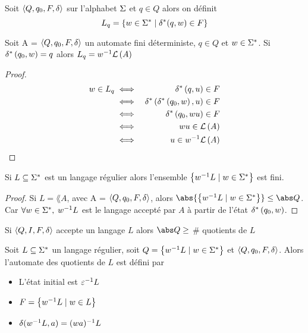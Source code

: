\begin{definition}
	Soit $\langle Q, q_0, F, \delta \rangle$ sur l'alphabet $\Sigma$ et $q \in Q$ alors on définit
	$$ L_q = \left\{w \in \Sigma^{*} \mid \delta^{*} (q,w) \in F\right\} $$
\end{definition}


\begin{lemma}
	Soit A = $\langle Q, q_0, F, \delta \rangle$ un automate fini déterministe, $q \in Q$ et $w \in \Sigma^{*}$. Si $\delta^{*} \left(q_0,w\right) = q$ alors
	$L_q = w^{-1} \mathcal{L}\left(A\right)$
\end{lemma}

\begin{proof}
	\begin{eqnarray*}
		w \in L_q &\iff& \delta^{*} \left(q,u\right) \in F \\
		&\iff& \delta^{*} \left(\delta^{*} \left(q_0,w\right),u\right) \in F \\
		&\iff& \delta^{*} \left(q_0,wu\right) \in F \\
		&\iff& wu \in \mathcal{L}\left(A\right) \\
		&\iff& u \in w^{-1} \mathcal{L}\left(A\right)
	\end{eqnarray*}
\end{proof}

\begin{coro}
	Si $L \subseteq \Sigma^{*}$ est un langage régulier alors l'ensemble $\left\{w^{-1} L \mid w \in \Sigma^{*}\right\}$ est fini.
\end{coro}

\begin{proof}
	Si $L = \lang A$, avec A = $\langle Q, q_0, F, \delta \rangle$, alors $\abs {\setdef {\quot w L} {w \in \mots}} \leq \abs Q$. Car $\forall w \in \Sigma^{*},$ $w^{-1} L$ est
	le langage accepté par $A$ à partir de l'état $\delta^{*} \left(q_0,w\right)$.
\end{proof}

\begin{coro} \label{coro:2}
	Si $\langle Q, I, F, \delta \rangle$ accepte un langage $L$ alors $\abs Q \geq $ \# quotients de $L$
\end{coro}

\begin{definition} 

	Soit $L \subseteq \Sigma^{*}$ un langage régulier, soit $Q = \left\{w^{-1} L \mid w \in \Sigma^{*}\right\}$ et $\langle Q, q_0, F, \delta \rangle$. Alors l'automate des quotients de $L$
	est défini par

	\begin{itemize}
		\item L'état initial est $\varepsilon^{-1} L$
		\item $F = \left\{w^{-1} L \mid w \in L\right\}$
		\item $\delta (w^{-1} L, a) = (wa)^{-1} L$
	\end{itemize}
\end{definition}

